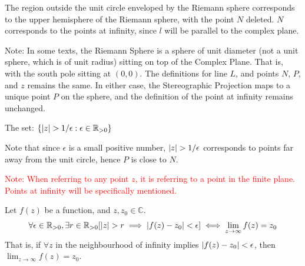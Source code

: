 \documentclass[12pt, english]{book}
\begin{document}
	The region outside the unit circle enveloped by the Riemann sphere corresponds to the upper hemisphere of the Riemann sphere, with the point $N$ deleted. $N$ corresponds to the points at infinity, since $l$ will be parallel to the complex plane. 
	
	Note: In some texts, the  Riemann Sphere is a sphere of unit diameter (not a unit sphere, which is of unit radius) sitting on top of the Complex Plane. That is, with the south pole sitting at \((0,0)\). The definitions for line \(L\), and points \(N\), \(P\), and \(z\) remains the same. In either case, the Stereographic Projection maps to a unique point \(P\) on the sphere, and the definition of the point at infinity remains unchanged.
	
	\begin{definition} 
		The set: $\{\abs{z} > 1/\epsilon : \epsilon \in \mathbb{R}_{>0} \}$
	\end{definition}
	Note that since $\epsilon$ is a small positive number, $\abs{z} > 1/\epsilon$ corresponds to points far away from the unit circle, hence $P$ is close to $N$. 
	
	\textcolor{red}{Note: When referring to any point $z$, it is referring to a point in the finite plane. Points at infinity will be specifically mentioned.}
	
	\begin{definition} 
		\label{Limit at Infinity Definition - Complex}
		Let \(f(z)\) be a function, and \(z, z_0 \in \mathbb{C}\).
		\begin{align*}
			\forall \epsilon \in \mathbb{R}_{>0}, \exists r \in \mathbb{R}_{>0}[\abs{z} > r \implies \abs{f(z)-z_0}<\epsilon] \iff \lim_{z\rightarrow \infty} f(z) = z_0
		\end{align*}
		That is, if \(\forall z\) in the neighbourhood of infinity implies \(\abs{f(z) - z_0} < \epsilon\), then \(\lim_{z \rightarrow \infty} f(z) = z_0\).
	\end{definition}
	
\end{document}
